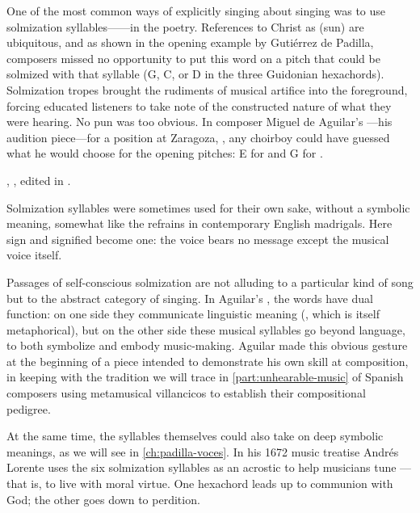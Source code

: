 One of the most common ways of explicitly singing about singing was to use
solmization syllables------in the poetry.
References to Christ as  (sun) are ubiquitous, and as shown in the
opening example by Gutiérrez de Padilla, composers missed no opportunity to put
this word on a pitch that could be solmized with that syllable (G, C, or D in
the three Guidonian hexachords).
Solmization tropes brought the rudiments of musical artifice into the
foreground, forcing educated listeners to take note of the constructed nature
of what they were hearing.
No pun was too obvious.
In composer Miguel de Aguilar's ---his audition piece---for a
position at Zaragoza, , any choirboy could have
guessed what he would choose for the opening pitches: E for  and G for
.
\begin{Footnote}
    , , edited
    in \autocite[34--64]{Ezquerro:MME55}. 
\end{Footnote}
Solmization syllables were sometimes used for their own sake, without a
symbolic meaning, somewhat like the  refrains in contemporary
English madrigals.
Here sign and signified become one: the voice bears no message except the
musical voice itself.

Passages of self-conscious solmization are not alluding to a particular kind of
song but to the abstract category of singing.
In Aguilar's , the words have dual function: on one side
they communicate linguistic meaning (, which is itself
metaphorical), but on the other side these musical syllables go beyond
language, to both symbolize and embody music-making. 
Aguilar made this obvious gesture at the beginning of a piece intended to
demonstrate his own skill at composition, in keeping with the tradition we will
trace in \cref{part:unhearable-music} of Spanish composers using metamusical
villancicos to establish their compositional pedigree.

At the same time, the syllables themselves could also take on deep symbolic
meanings, as we will see in \cref{ch:padilla-voces}.
In his 1672 music treatise Andrés Lorente uses the six solmization syllables as
an acrostic to help musicians tune ---that is, to live with moral virtue.%
    \Autocite[689]{Lorente:Porque}
One hexachord leads up to communion with God; the other goes down to perdition.

